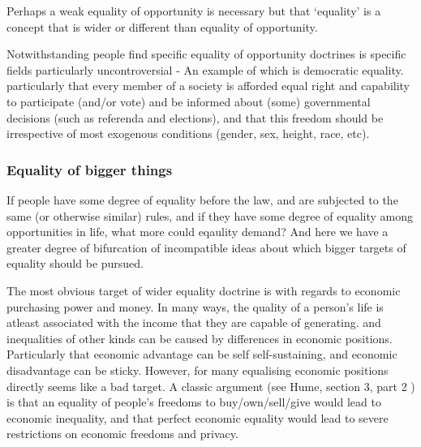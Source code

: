 \documentclass{article}
\begin{document}
Perhaps a weak equality of opportunity is necessary but that `equality' is a concept that is wider or different than equality of opportunity.

Notwithstanding people find specific equality of opportunity doctrines is specific fields particularly uncontroversial - An example of which is democratic equality.
particularly that every member of a society is afforded equal right and capability to participate (and/or vote) and be informed about (some) governmental decisions (such as referenda and elections), and that this freedom should be irrespective of most exogenous conditions (gender, sex, height, race, etc).


\subsubsection{Equality of bigger things}

If people have some degree of equality before the law, and are subjected to the same (or otherwise similar) rules, and if they have some degree of equality among opportunities in life, what more could eqaulity demand?
And here we have a greater degree of bifurcation of incompatible ideas about which bigger targets of equality should be pursued.

The most obvious target of wider equality doctrine is with regards to economic purchasing power and money.
In many ways, the quality of a person's life is atleast associated with the income that they are capable of generating. and inequalities of other kinds can be caused by differences in economic positions.
Particularly that economic advantage can be self self-sustaining, and economic disadvantage can be sticky.
However, for many equalising economic positions directly seems like a bad target.
A classic argument (see Hume, section 3, part 2 \cite{hume2006enquiry}) is that an equality of people's freedoms to buy/own/sell/give would lead to economic inequality, and that perfect economic equality would lead to severe restrictions on economic freedoms and privacy.
\end{document}
